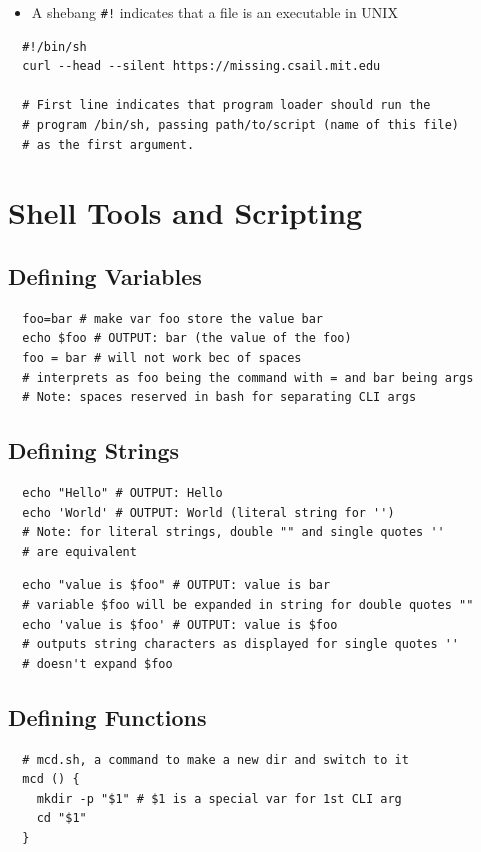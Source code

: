 \documentclass[letterpaper,12pt]{article}
\begin{document}
\begin{itemize}
 \item A shebang \lstinline{#!} indicates that a file is an executable in UNIX
\end{itemize}

\begin{lstlisting}
  #!/bin/sh
  curl --head --silent https://missing.csail.mit.edu

  # First line indicates that program loader should run the
  # program /bin/sh, passing path/to/script (name of this file)
  # as the first argument.
\end{lstlisting}

\section{Shell Tools and Scripting}

\subsection{Defining Variables}

\begin{lstlisting}
  foo=bar # make var foo store the value bar
  echo $foo # OUTPUT: bar (the value of the foo)
  foo = bar # will not work bec of spaces
  # interprets as foo being the command with = and bar being args
  # Note: spaces reserved in bash for separating CLI args
\end{lstlisting}

\subsection{Defining Strings}

\begin{lstlisting}
  echo "Hello" # OUTPUT: Hello
  echo 'World' # OUTPUT: World (literal string for '')
  # Note: for literal strings, double "" and single quotes ''
  # are equivalent
\end{lstlisting}

\begin{lstlisting}
  echo "value is $foo" # OUTPUT: value is bar
  # variable $foo will be expanded in string for double quotes ""
  echo 'value is $foo' # OUTPUT: value is $foo
  # outputs string characters as displayed for single quotes ''
  # doesn't expand $foo
\end{lstlisting}

\subsection{Defining Functions}
\begin{lstlisting}
  # mcd.sh, a command to make a new dir and switch to it
  mcd () {
    mkdir -p "$1" # $1 is a special var for 1st CLI arg
    cd "$1"
  }
\end{lstlisting}
\end{document}

